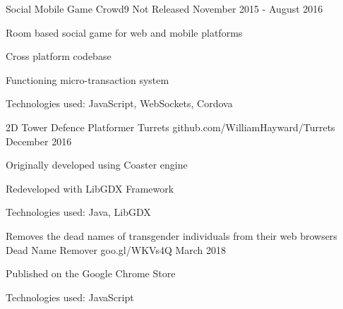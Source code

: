 \begin{cventries}

\cventry
{Social Mobile Game} %
{Crowd9} %
{Not Released} %
{November 2015 - August 2016} %
{ %
\begin{cvitems}
\item Room based social game for web and mobile platforms
\item Cross platform codebase
\item Functioning micro-transaction system
\item Technologies used: JavaScript, WebSockets, Cordova
\end{cvitems}
}


\cventry
{2D Tower Defence Platformer} %
{Turrets} %
{github.com/WilliamHayward/Turrets} %
{December 2016} %
{ %
\begin{cvitems}
\item Originally developed using Coaster engine
\item Redeveloped with LibGDX Framework
\item Technologies used: Java, LibGDX
\end{cvitems}
}


\cventry
{Removes the dead names of transgender individuals from their web browsers} %
{Dead Name Remover} %
{goo.gl/WKVs4Q} %
{March 2018} %
{ %
\begin{cvitems}
\item Published on the Google Chrome Store
\item Technologies used: JavaScript
\end{cvitems}
}

\end{cventries}